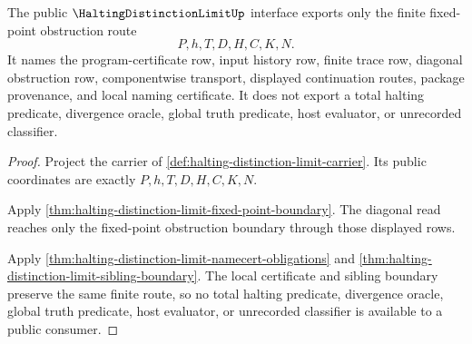 \begin{theorem}
\label{thm:halting-distinction-limit-public-boundary}
The public $\HaltingDistinctionLimitUp$ interface exports only the finite fixed-point obstruction route
$$
P,h,T,D,H,C,K,N .
$$
It names the program-certificate row, input history row, finite trace row, diagonal obstruction row, componentwise transport, displayed continuation routes, package provenance, and local naming certificate. It does not export a total halting predicate, divergence oracle, global truth predicate, host evaluator, or unrecorded classifier.
\end{theorem}
\begin{proof}
Project the carrier of \autoref{def:halting-distinction-limit-carrier}. Its public coordinates are exactly $P,h,T,D,H,C,K,N$.

Apply \autoref{thm:halting-distinction-limit-fixed-point-boundary}. The diagonal read reaches only the fixed-point obstruction boundary through those displayed rows.

Apply \autoref{thm:halting-distinction-limit-namecert-obligations} and \autoref{thm:halting-distinction-limit-sibling-boundary}. The local certificate and sibling boundary preserve the same finite route, so no total halting predicate, divergence oracle, global truth predicate, host evaluator, or unrecorded classifier is available to a public consumer.
\end{proof}

